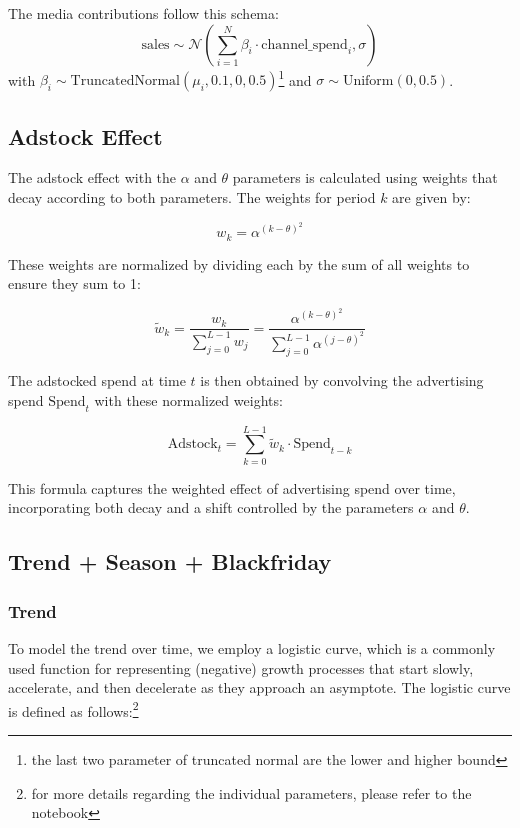 \documentclass{article}
\begin{document}
The media contributions follow this schema:
\[
    \text{sales} \sim \mathcal{N}\left(\sum_{i=1}^{N} \beta_i \cdot \mathrm{channel\_spend}_i, \sigma\right)
\]
with $\beta_i \sim \text{TruncatedNormal}(\mu_i, 0.1, 0, 0.5)$\footnote{the last two parameter of truncated normal are the lower and higher bound} and $\sigma \sim \text{Uniform}(0, 0.5)$.

\subsection{Adstock Effect}

\noindent
The adstock effect with the \(\alpha\) and \(\theta\) parameters is calculated using weights that decay according to both parameters. The weights for period \( k \) are given by:

\[
w_k = \alpha^{(k - \theta)^2}
\]

These weights are normalized by dividing each by the sum of all weights to ensure they sum to 1:

\[
\tilde{w}_k = \frac{w_k}{\sum_{j=0}^{L-1} w_j} = \frac{\alpha^{(k - \theta)^2}}{\sum_{j=0}^{L-1} \alpha^{(j - \theta)^2}}
\]

The adstocked spend at time \( t \) is then obtained by convolving the advertising spend \( \text{Spend}_t \) with these normalized weights:

\[
\mathrm{Adstock}_t = \sum_{k=0}^{L-1} \tilde{w}_k \cdot \text{Spend}_{t-k}
\]

This formula captures the weighted effect of advertising spend over time, incorporating both decay and a shift controlled by the parameters \( \alpha \) and \(\theta\).

\subsection{Trend + Season + Blackfriday}

\subsubsection{Trend}

\noindent
To model the trend over time, we employ a logistic curve, which is a commonly used function for representing (negative) growth processes that start slowly, accelerate, and then decelerate as they approach an asymptote. The logistic curve is defined as follows:\footnote{for more details regarding the individual parameters, please refer to the notebook}
\end{document}
